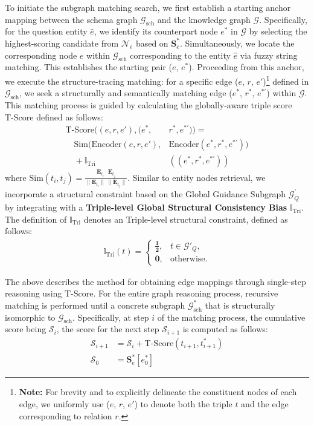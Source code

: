\documentclass[11pt]{article}
\begin{document}
To initiate the subgraph matching search, we first establish a starting anchor mapping between the schema graph \( \mathcal{G}_\text{sch} \) and the knowledge graph \( \mathcal{G} \). Specifically, for the question entity $\hat{e}$, we identify its counterpart node $e^*$ in \( \mathcal{G} \) by selecting the highest-scoring candidate from $\mathcal{N}_{\hat{e}}$ based on $\boldsymbol{S}^*_{\hat{e}}$. Simultaneously, we locate the corresponding node $e$ within \( \mathcal{G}_\text{sch} \) corresponding to the entity
$\hat{e}$ via fuzzy string matching. This establishes the starting pair ($e$, $e^*$). Proceeding from this anchor, we execute the structure-tracing matching: for a specific edge ($e$, $r$, $e'$)\footnote{\textbf{Note:} For brevity and to explicitly delineate the constituent nodes of each edge, we uniformly use ($e$, $r$, $e'$) to denote both the triple $t$ and the edge corresponding to relation $r$.} defined in \( \mathcal{G}_\text{sch} \), we seek a structurally and semantically matching edge ($e^*$, $r^*$, $e^{*'}$) within \( \mathcal{G} \). This matching process is guided by calculating the globally-aware triple score $\mathrm{T\text{-}Score}$ defined as follows:
\begin{align}
\mathrm{T\text{-}Score}((e, r, e'), (e^*, &r^*, e^{*'})) = \nonumber \\
     \quad \mathrm{Sim}(\text{Encoder}(e, r, e'), &\text{Encoder}(e^*, r^*, e^{*'})) \nonumber \\
     \quad + \mathbb{I}_\text{Tri}&((e^*, r^*, e^{*'}))
\label{eq:t-score}
\end{align}
where $\mathrm{Sim}(t_i, t_j)=\frac{\mathbf{E}_{t_i} \cdot \mathbf{E}_{t_j}}{\|\mathbf{E}_{t_i}\|\,\|\mathbf{E}_{t_j}\|}$. Similar to entity nodes retrieval, we incorporate a structural constraint based on the Global Guidance Subgraph \( \mathcal{G}^{'}_Q \) by integrating with a \textbf{Triple-level Global Structural Consistency Bias} $\mathbb{I}_\text{Tri}$. 
The definition of $\mathbb{I}_\text{Tri}$ denotes an Triple-level structural constraint, defined as follows:
\begin{align}
\mathbb{I}_\text{Tri}(t) = \begin{cases} 
\boldsymbol{\frac{1}{2}}, & t \in \mathcal{G}'_Q, \\
\boldsymbol{0}, & \text{otherwise}.
\end{cases}
\label{eq:triple_bias}
\end{align}

The above describes the method for obtaining edge mappings through single-step reasoning using $\mathrm{T\text{-}Score}$. For the entire graph reasoning process, recursive matching is performed until a concrete subgraph $\mathcal{G}_\text{sch}^*$ that is structurally isomorphic to $\mathcal{G}_\text{sch}$. Specifically, at step $i$ of the matching process, the cumulative score being $\mathcal{S}_i$, the score for the next step $\mathcal{S}_{i+1}$ is computed as follows:
\begin{align}
\mathcal{S}_{i+1} &= \mathcal{S}_i + \mathrm{T\text{-}Score}(t_{i+1}, t_{i+1}^*) \\
\mathcal{S}_0 &= \boldsymbol{S}^*_e[e_0^*]
\end{align}
\end{document}

